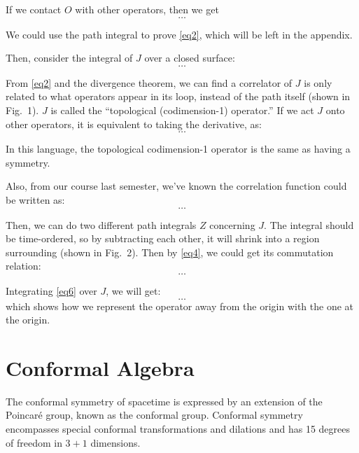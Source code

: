 \documentclass[12pt]{article}
\numberwithin{equation}{section}
\newcommand\<\langle
\renewcommand\>\rangle
\renewcommand\.{\cdot}
\begin{document}
If we contact $O$ with other operators, then we get
\begin{equation}
\label{eq2}
\ldots
\end{equation}

We could use the path integral to prove \eqref{eq2}, which will be left in the appendix.

Then, consider the integral of $J$ over a closed surface:
\begin{equation}
\label{eq3}
\ldots
\end{equation}

From \eqref{eq2} and the divergence theorem, we can find a correlator of $J$ is only related to what operators appear in its loop, instead of the path itself (shown in Fig.~1). $J$ is called the “topological (codimension-1) operator.” If we act $J$ onto other operators, it is equivalent to taking the derivative, as:
\begin{equation}
\label{eq4}
\ldots
\end{equation}

In this language, the topological codimension-1 operator is the same as having a symmetry.

Also, from our course last semester, we’ve known the correlation function could be written as:
\begin{equation}
\label{eq5}
\ldots
\end{equation}

Then, we can do two different path integrals $Z$ concerning $J$. The integral should be time-ordered, so by subtracting each other, it will shrink into a region surrounding (shown in Fig.~2). Then by \eqref{eq4}, we could get its commutation relation:
\begin{equation}
\label{eq6}
\ldots
\end{equation}



Integrating \eqref{eq6} over $J$, we will get:
\begin{equation}
\label{eq7}
\ldots
\end{equation}
which shows how we represent the operator away from the origin with the one at the origin.
\section{Conformal Algebra}

The conformal symmetry of spacetime is expressed by an extension of the Poincaré group, known as the conformal group. Conformal symmetry encompasses special conformal transformations and dilations and has 15 degrees of freedom in $3+1$ dimensions.
\end{document}
